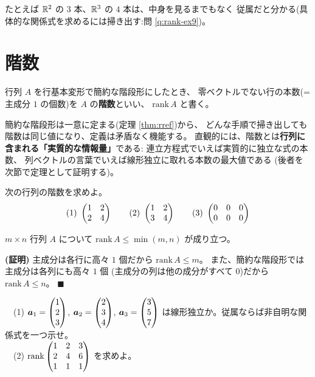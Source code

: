 たとえば $\mathbb{R}^2$ の $3$ 本、$\mathbb{R}^3$ の $4$ 本は、中身を見るまでもなく
従属だと分かる(具体的な関係式を求めるには掃き出す:問 \ref{q:rank-ex9})。

\section{階数}

\begin{teigi}[階数]\label{def:rank}
行列 $A$ を行基本変形で簡約な階段形にしたとき、
零ベクトルでない行の本数(=主成分 $1$ の個数)を $A$ の\textbf{階数}といい、
$\mathrm{rank}\,A$ と書く。
\end{teigi}

簡約な階段形は一意に定まる(定理 \ref{thm:rref})から、
どんな手順で掃き出しても階数は同じ値になり、定義は矛盾なく機能する。
直観的には、階数とは\textbf{行列に含まれる「実質的な情報量」}である:
連立方程式でいえば実質的に独立な式の本数、
列ベクトルの言葉でいえば線形独立に取れる本数の最大値である
(後者を次節で定理として証明する)。

\begin{mondai}\label{q:rank-quick}
次の行列の階数を求めよ。
\[
(1)\ \begin{pmatrix}1 & 2 \\ 2 & 4\end{pmatrix} \qquad
(2)\ \begin{pmatrix}1 & 2 \\ 3 & 4\end{pmatrix} \qquad
(3)\ \begin{pmatrix}0 & 0 & 0 \\ 0 & 0 & 0\end{pmatrix}
\]
\end{mondai}

\begin{teiri}[階数の基本性質]\label{thm:rank-basic}
$m \times n$ 行列 $A$ について
$\mathrm{rank}\,A \le \min(m, n)$ が成り立つ。
\end{teiri}

\noindent\textbf{(証明)}\quad
主成分は各行に高々 $1$ 個だから $\mathrm{rank}\,A \le m$。
また、簡約な階段形では主成分は各列にも高々 $1$ 個
(主成分の列は他の成分がすべて $0$)だから
$\mathrm{rank}\,A \le n$。 $\blacksquare$

\begin{mondai}\label{q:indep}
　(1) $\bm{a}_1 = \begin{pmatrix}1 \\ 2 \\ 3\end{pmatrix}$, $\bm{a}_2 = \begin{pmatrix}2 \\ 3 \\ 4\end{pmatrix}$,
$\bm{a}_3 = \begin{pmatrix}3 \\ 5 \\ 7\end{pmatrix}$ は線形独立か。従属ならば非自明な関係式を一つ示せ。\\
　(2) $\mathrm{rank} \begin{pmatrix}1 & 2 & 3 \\ 2 & 4 & 6 \\ 1 & 1 & 1\end{pmatrix}$ を求めよ。
\end{mondai}

